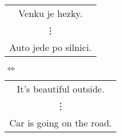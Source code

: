 \documentclass[12pt]{article}
\begin{document}
  \thispagestyle{empty}%

        \begin{tabular}{|c|}
          \hline
          Venku je hezky. \\
          \vdots \\
          Auto jede po silnici. \\
          \hline
        \end{tabular}
        $\Longleftrightarrow$
        \begin{tabular}{|c|}
          \hline
          It's beautiful outside. \\
          \vdots \\
          Car is going on the road. \\
          \hline
        \end{tabular}
\end{document}

